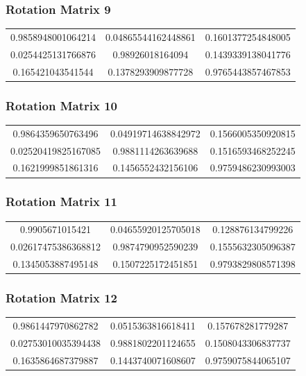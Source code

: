 \documentclass[12pt]{article}
\begin{document}
\subsubsection{Rotation Matrix 9}
\begin{tabular}{|c|c|c|}
\hline

  
 0.9858948001064214 &  0.04865544162448861 &  0.1601377254848005 \\ 
  0.0254425131766876 &  0.98926018164094 &  0.1439339138041776 \\ 
  0.165421043541544 &  0.1378293909877728 &  0.9765443857467853
\\ 
\hline
\end{tabular}
\subsubsection{Rotation Matrix 10}
\begin{tabular}{|c|c|c|}
\hline

  
 0.9864359650763496 &  0.04919714638842972 &  0.1566005350920815 \\ 
  0.02520419825167085 &  0.9881114263639688 &  0.1516593468252245 \\ 
  0.1621999851861316 &  0.1456552432156106 &  0.9759486230993003
\\ 
\hline
\end{tabular}
\subsubsection{Rotation Matrix 11}
\begin{tabular}{|c|c|c|}
\hline

  
 0.9905671015421 &  0.04655920125705018 &  0.128876134799226 \\ 
  0.02617475386368812 &  0.9874790952590239 &  0.1555632305096387 \\ 
  0.1345053887495148 &  0.1507225172451851 &  0.9793829808571398
\\ 
\hline
\end{tabular}
\subsubsection{Rotation Matrix 12}
\begin{tabular}{|c|c|c|}
\hline

  
 0.9861447970862782 &  0.0515363816618411 &  0.157678281779287 \\ 
  0.02753010035394438 &  0.9881802201124655 &  0.1508043306837737 \\ 
  0.1635864687379887 &  0.1443740071608607 &  0.9759075844065107
\\ 
\hline
\end{tabular}
\end{document}
